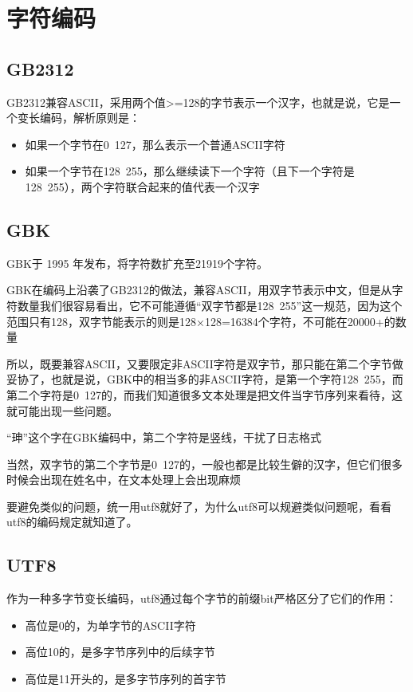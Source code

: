 \section{字符编码}


\subsection{GB2312}

GB2312兼容ASCII，采用两个值>=128的字节表示一个汉字，也就是说，它是一个变长编码，解析原则是：

\begin{itemize}
  \item 如果一个字节在0~127，那么表示一个普通ASCII字符
  \item 如果一个字节在128~255，那么继续读下一个字符（且下一个字符是128~255），两个字符联合起来的值代表一个汉字
\end{itemize}

\subsection{GBK}

GBK于 1995 年发布，将字符数扩充至21919个字符。

GBK在编码上沿袭了GB2312的做法，兼容ASCII，用双字节表示中文，但是从字符数量我们很容易看出，它不可能遵循“双字节都是128~255”这一规范，因为这个范围只有128，双字节能表示的则是128×128=16384个字符，不可能在20000+的数量

所以，既要兼容ASCII，又要限定非ASCII字符是双字节，那只能在第二个字节做妥协了，也就是说，GBK中的相当多的非ASCII字符，是第一个字符128~255，而第二个字符是0~127的，而我们知道很多文本处理是把文件当字节序列来看待，这就可能出现一些问题。

“珅”这个字在GBK编码中，第二个字符是竖线，干扰了日志格式

当然，双字节的第二个字节是0~127的，一般也都是比较生僻的汉字，但它们很多时候会出现在姓名中，在文本处理上会出现麻烦

要避免类似的问题，统一用utf8就好了，为什么utf8可以规避类似问题呢，看看utf8的编码规定就知道了。

\subsection{UTF8}

作为一种多字节变长编码，utf8通过每个字节的前缀bit严格区分了它们的作用：

\begin{itemize}
  \item 高位是0的，为单字节的ASCII字符
  \item 高位10的，是多字节序列中的后续字节
  \item 高位是11开头的，是多字节序列的首字节
\end{itemize}

